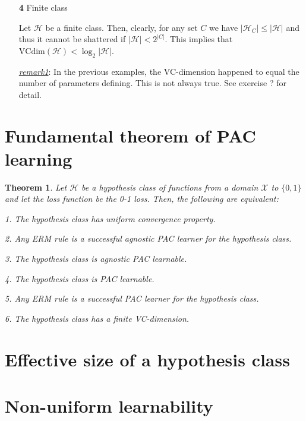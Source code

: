 \documentclass{article}
\newtheorem{theorem}{Theorem}
\begin{document}
\begin{itemize}
	\item [\textbf{4}] Finite class
	
	Let $\mathcal{H}$ be a finite class. Then, clearly, for any set $C$ we have $|\mathcal{H}_C|\leq|\mathcal{H}|$ and thus it cannot be shattered if $|\mathcal{H}|<2^{|C|}$. This implies that $\mathrm{VCdim}(\mathcal{H})<\log_2|\mathcal{H}|$.
	
	\textit{\underline{remark1}}: In the previous examples, the VC-dimension happened to equal the number of parameters defining.  This is not always true. See exercise ? for detail.
	\end{itemize}

\section{Fundamental theorem of PAC learning}

	\begin{theorem}
	Let $\mathcal{H}$ be a hypothesis class of functions from a domain $\mathcal{X}$ to $\{0,1\}$ and let the loss function be the 0-1 loss. Then, the following are equivalent:
	
	1. The hypothesis class has uniform convergence property.
%
%
%

	2. Any ERM rule is a successful agnostic PAC learner for the hypothesis class.
	
	3. The hypothesis class is agnostic PAC learnable.


	4. The hypothesis class is PAC learnable.


	5. Any ERM rule is a successful PAC learner for the hypothesis class.
	
	6. The hypothesis class has a finite VC-dimension.
%
	\end{theorem}		
%
%
\section{Effective size of a hypothesis class}

\section{Non-uniform learnability}
\end{document}
